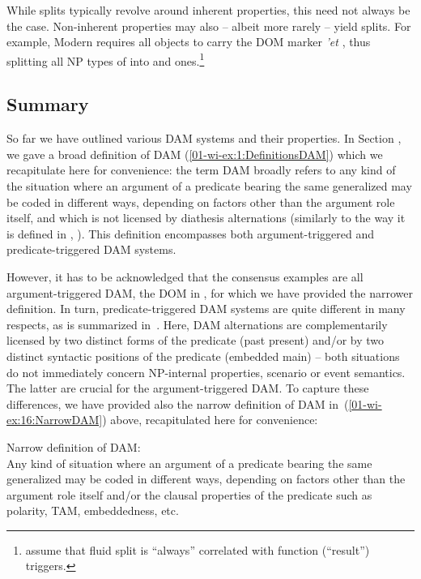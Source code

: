 \documentclass[output=paper]{LSP/langsci}
\begin{document}
While splits typically revolve around inherent properties, this need not always be the case. Non-inherent properties may also – albeit more rarely – yield splits. 
For example, Modern  requires all  objects to carry the DOM marker \textit{’et} \citep{Danon2001Syntactic}, thus splitting all NP types of  into  and  ones.\footnote{\citet[5]{Kleinetal2011Case} assume that fluid \vs split is “always” correlated with function (“result”) \vs triggers.}

\subsection{Summary}
\label{01-wi-sec:3.5-Summary}

So far we have outlined various DAM systems and their properties. 
In Section , we gave a broad definition of DAM (\ref{01-wi-ex:1:DefinitionsDAM}) which we recapitulate here for convenience: the term DAM broadly refers to any kind of the situation where an argument of a predicate bearing the same generalized  may be coded in different ways, depending on factors other than the argument role itself, and which is not licensed by diathesis alternations (similarly to the way it is defined in \citealt{Woolford2008Differential}, \citealt{Iemmoloetal2012Differential}). 
This definition encompasses both argument-triggered and predicate-triggered DAM systems.
 
However, it has to be acknowledged that the consensus examples are all argument-triggered DAM, \eg the DOM in , for which we have provided the narrower definition. 
In turn, predicate-triggered DAM systems are quite different in many respects, as is summarized in~.
Here, DAM alternations are complementarily licensed by two distinct forms of the predicate (\eg past \vs present) and/or by two distinct syntactic positions of the predicate (embedded \vs main) – both situations do not immediately concern NP-internal properties, scenario or event semantics. 
The latter are crucial for the argument-triggered DAM. 
To capture these differences, we have provided also the narrow definition of DAM in~(\ref{01-wi-ex:16:NarrowDAM}) above, recapitulated here for convenience:

\begin{exe}
Narrow definition of DAM:\\
Any kind of situation where an argument of a predicate bearing the same generalized  may be coded in different ways, depending on factors other than the argument role itself and/or the clausal properties of the predicate such as polarity, TAM, embeddedness, etc.\\
\end{exe}
\end{document}
